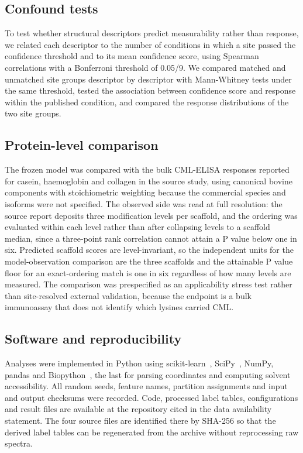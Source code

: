 \documentclass[journal=jprobs,manuscript=article,layout=traditional]{achemso}
\begin{document}
\subsection{Confound tests}

To test whether structural descriptors predict measurability rather than response, we related each descriptor to the number of conditions in which a site passed the confidence threshold and to its mean confidence score, using Spearman correlations with a Bonferroni threshold of 0.05/9. We compared matched and unmatched site groups descriptor by descriptor with Mann-Whitney tests under the same threshold, tested the association between confidence score and response within the published condition, and compared the response distributions of the two site groups.

\subsection{Protein-level comparison}

The frozen model was compared with the bulk CML-ELISA responses reported for casein, haemoglobin and collagen in the source study, using canonical bovine components with stoichiometric weighting because the commercial species and isoforms were not specified. The observed side was read at full resolution: the source report deposits three modification levels per scaffold, and the ordering was evaluated within each level rather than after collapsing levels to a scaffold median, since a three-point rank correlation cannot attain a P value below one in six. Predicted scaffold scores are level-invariant, so the independent units for the model-observation comparison are the three scaffolds and the attainable P value floor for an exact-ordering match is one in six regardless of how many levels are measured. The comparison was prespecified as an applicability stress test rather than site-resolved external validation, because the endpoint is a bulk immunoassay that does not identify which lysines carried CML.

\subsection{Software and reproducibility}

Analyses were implemented in Python using scikit-learn~\cite{pedregosa2011}, SciPy~\cite{virtanen2020}, NumPy, pandas and Biopython~\cite{cock2009}, the last for parsing coordinates and computing solvent accessibility. All random seeds, feature names, partition assignments and input and output checksums were recorded. Code, processed label tables, configurations and result files are available at the repository cited in the data availability statement. The four source files are identified there by SHA-256 so that the derived label tables can be regenerated from the archive without reprocessing raw spectra.
\end{document}
